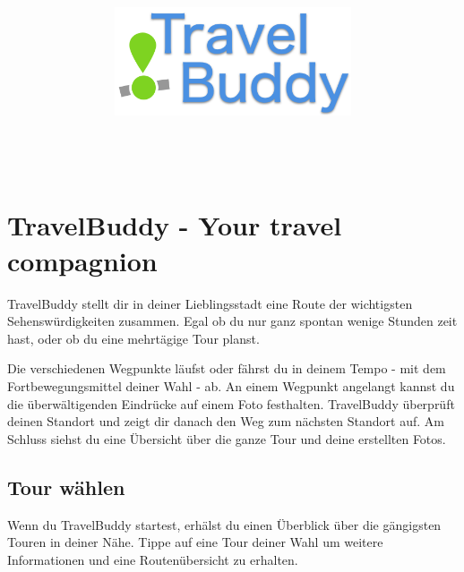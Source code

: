 \documentclass[a4paper,10pt,xetex]{article}
\title{
  \includegraphics[width=7cm]{travel-buddy_white}\\[\bigskipamount]
  \documenttitle\\[\bigskipamount]
}
\author{\documentauthors}
\date{\parbox{\linewidth}{\centering%
  IT15TA ZH \hspace*{3cm} Gruppe 3\endgraf\bigskip
  Dokumentversion \documentversion, \documentdate\endgraf
}}
\begin{document}

\maketitle\newpage

%

\section{TravelBuddy - Your travel compagnion}

TravelBuddy stellt dir in deiner Lieblingsstadt eine Route der wichtigsten Sehenswürdigkeiten
zusammen. Egal ob du nur ganz spontan wenige Stunden zeit hast, oder ob du eine mehrtägige
Tour planst.

Die verschiedenen Wegpunkte läufst oder fährst du in deinem Tempo - mit dem Fortbewegungsmittel
deiner Wahl - ab. An einem Wegpunkt angelangt kannst du die überwältigenden Eindrücke auf
einem Foto festhalten. TravelBuddy überprüft deinen Standort und zeigt dir danach den Weg
zum nächsten Standort auf. Am Schluss siehst du eine Übersicht über die ganze Tour und
deine erstellten Fotos.

\subsection{Tour wählen}
Wenn du TravelBuddy startest, erhälst du einen Überblick über die gängigsten Touren in
deiner Nähe. Tippe auf eine Tour deiner Wahl um weitere Informationen und eine
Routenübersicht zu erhalten.
\end{document}

